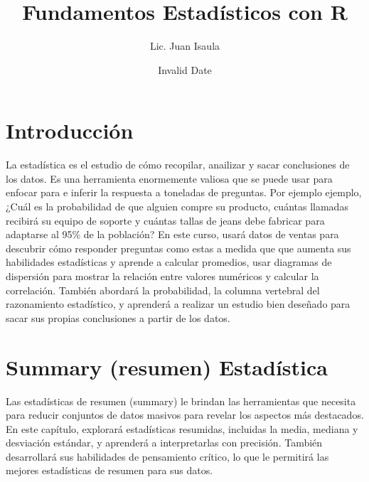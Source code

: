 \documentclass[
  letterpaper,
  DIV=11,
  numbers=noendperiod]{scrreprt}
\title{Fundamentos Estadísticos con R}
\author{Lic. Juan Isaula}
\date{Invalid Date}
\renewcommand*\contentsname{Table of contents}
\newcommand\contentsname{Table of contents}
\begin{document}
\maketitle
\ifdefined\Shaded\renewenvironment{Shaded}{\begin{tcolorbox}[borderline west={3pt}{0pt}{shadecolor}, breakable, frame hidden, enhanced, boxrule=0pt, sharp corners, interior hidden]}{\end{tcolorbox}}\fi

\renewcommand*\contentsname{Table of contents}
{
\hypersetup{linkcolor=}
\setcounter{tocdepth}{2}
\tableofcontents
}

\hypertarget{introducciuxf3n}{%
\chapter*{Introducción}\label{introducciuxf3n}}


La estadística es el estudio de cómo recopilar, anailizar y sacar
conclusiones de los datos. Es una herramienta enormemente valiosa que se
puede usar para enfocar para e inferir la respuesta a toneladas de
preguntas. Por ejemplo ejemplo, ¿Cuál es la probabilidad de que alguien
compre su producto, cuántas llamadas recibirá su equipo de soporte y
cuántas tallas de jeans debe fabricar para adaptarse al 95\% de la
población? En este curso, usará datos de ventas para descubrir cómo
responder preguntas como estas a medida que que aumenta sus habilidades
estadísticas y aprende a calcular promedios, usar diagramas de
dispersión para mostrar la relación entre valores numéricos y calcular
la correlación. También abordará la probabilidad, la columna vertebral
del razonamiento estadístico, y aprenderá a realizar un estudio bien
deseñado para sacar sus propias conclusiones a partir de los datos.


\hypertarget{summary-resumen-estaduxedstica}{%
\chapter{Summary (resumen)
Estadística}\label{summary-resumen-estaduxedstica}}

Las estadísticas de resumen (summary) le brindan las herramientas que
necesita para reducir conjuntos de datos masivos para revelar los
aspectos más destacados. En este capítulo, explorará estadísticas
resumidas, incluidas la media, mediana y desviación estándar, y
aprenderá a interpretarlas con precisión. También desarrollará sus
habilidades de pensamiento crítico, lo que le permitirá las mejores
estadísticas de resumen para sus datos.
\end{document}
